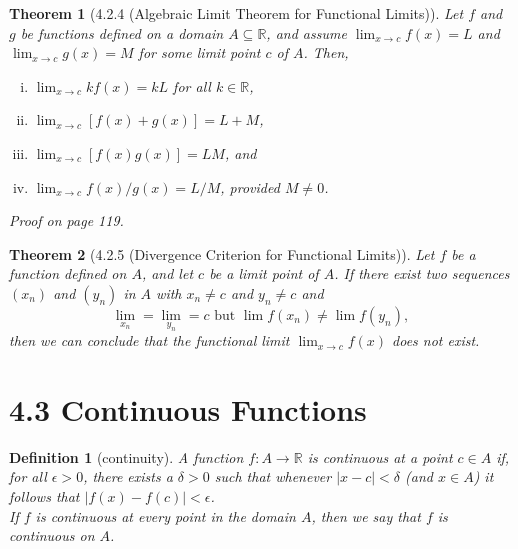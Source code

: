 \documentclass{article}
\newtheorem{definition}{Definition}
\newtheorem{theorem}{Theorem}
\begin{document}
\begin{theorem}[4.2.4 (Algebraic Limit Theorem for Functional Limits)]
    Let $f$ and $g$ be functions defined on a domain $A \subseteq \mathbb{R}$, and assume $\lim _{x \rightarrow c}f(x)=L$ and $\lim _{x \rightarrow c}g(x)=M$ for some limit point $c$ of $A$. Then,
    \begin{enumerate}[(i)]
        \item $\lim _{x \rightarrow c}kf(x)=kL$ for all $k \in \mathbb{R}$,
        \item $\lim _{x \rightarrow c}[f(x) + g(x)]=L+M$,
        \item $\lim _{x \rightarrow c}[f(x)g(x)]=LM$, and
        \item $\lim _{x \rightarrow c}f(x)/g(x)=L/M$, provided $M \neq 0$.
    \end{enumerate}
    Proof on page 119.
\end{theorem}

\begin{theorem}[4.2.5 (Divergence Criterion for Functional Limits)]
    Let $f$ be a function defined on $A$, and let $c$ be a limit point of $A$. If there exist two sequences $(x_n)$ and $(y_n)$ in $A$ with $x_n \neq c$ and $y_n \neq c$ and \[\lim _{x_n}=\lim _{y_n}=c \text{ but } \lim f(x_n)\neq \lim f(y_n),\]
    then we can conclude that the functional limit $\lim _{x \rightarrow c}f(x)$ does not exist.
\end{theorem}

\section*{4.3 Continuous Functions}
\begin{definition}[continuity]
    A function $f:A\rightarrow \mathbb{R}$ is \textit{continuous} at a point $c \in A$ if, for all $\epsilon > 0$, there exists a $\delta > 0$ such that whenever $|x-c|<\delta$ (and $x \in A$) it follows that $|f(x)-f(c)|<\epsilon$.\\

    If $f$ is continuous at every point in the domain $A$, then we say that $f$ is continuous on $A$.
\end{definition}
\end{document}
